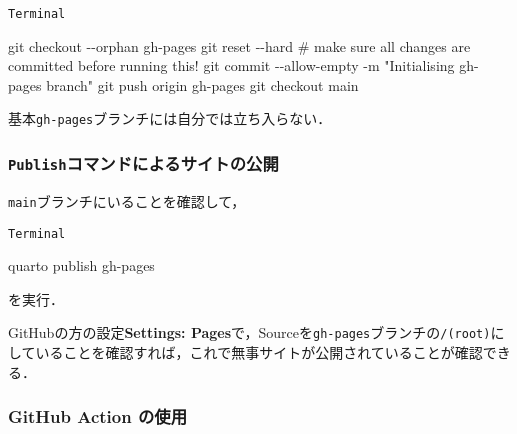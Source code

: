 \documentclass[
]{ltjsarticle}
\newenvironment{Shaded}{\begin{snugshade}}{\end{snugshade}}
\newcommand{\AttributeTok}[1]{\textcolor[rgb]{0.40,0.45,0.13}{#1}}
\newcommand{\CommentTok}[1]{\textcolor[rgb]{0.37,0.37,0.37}{#1}}
\newcommand{\ExtensionTok}[1]{\textcolor[rgb]{0.00,0.23,0.31}{#1}}
\newcommand{\FunctionTok}[1]{\textcolor[rgb]{0.28,0.35,0.67}{#1}}
\newcommand{\NormalTok}[1]{\textcolor[rgb]{0.00,0.23,0.31}{#1}}
\newcommand{\StringTok}[1]{\textcolor[rgb]{0.13,0.47,0.30}{#1}}
\begin{document}
\begin{codelisting}

\caption{\texttt{Terminal}}

\begin{Shaded}
\begin{Highlighting}[]
\FunctionTok{git}\NormalTok{ checkout }\AttributeTok{{-}{-}orphan}\NormalTok{ gh{-}pages}
\FunctionTok{git}\NormalTok{ reset }\AttributeTok{{-}{-}hard} \CommentTok{\# make sure all changes are committed before running this!}
\FunctionTok{git}\NormalTok{ commit }\AttributeTok{{-}{-}allow{-}empty} \AttributeTok{{-}m} \StringTok{"Initialising gh{-}pages branch"}
\FunctionTok{git}\NormalTok{ push origin gh{-}pages}
\FunctionTok{git}\NormalTok{ checkout main}
\end{Highlighting}
\end{Shaded}

\end{codelisting}

基本\texttt{gh-pages}ブランチには自分では立ち入らない．

\subsubsection{\texorpdfstring{\texttt{Publish}コマンドによるサイトの公開}{Publishコマンドによるサイトの公開}}\label{publishux30b3ux30deux30f3ux30c9ux306bux3088ux308bux30b5ux30a4ux30c8ux306eux516cux958b}

\texttt{main}ブランチにいることを確認して，

\begin{codelisting}

\caption{\texttt{Terminal}}

\begin{Shaded}
\begin{Highlighting}[]
\ExtensionTok{quarto}\NormalTok{ publish gh{-}pages}
\end{Highlighting}
\end{Shaded}

\end{codelisting}

を実行．

GitHubの方の設定\textbf{Settings:
Pages}で，Sourceを\texttt{gh-pages}ブランチの\texttt{/(root)}にしていることを確認すれば，これで無事サイトが公開されていることが確認できる．

\subsubsection{GitHub Action
の使用}\label{github-action-ux306eux4f7fux7528}
\end{document}
